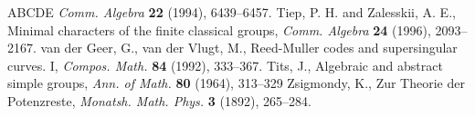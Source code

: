 \documentclass[11pt]{amsart}
\theoremstyle{plain}
\theoremstyle{definition}
\numberwithin{thm}{section}
\numberwithin{equation}{thm}
\newcommand{\0}{\emptyset}
\begin{document}
\begin{thebibliography}{ABCDE}
{\it Comm. Algebra} {\bf 22} (1994), 6439--6457. 
\medskip
{}
Tiep, P. H. and Zalesskii, A. E., Minimal characters of the finite classical
groups, {\it Comm. Algebra} {\bf 24} (1996), 2093--2167.
\medskip
{}van der Geer, G., van der Vlugt, M., Reed-Muller codes and supersingular curves. I, {\it  Compos. Math.} 
{\bf 84} (1992), 333--367.
\medskip
{}
  Tits, J., Algebraic and abstract simple groups, {\it Ann. of Math.} {\bf 80} (1964), 313--329
\medskip
{}
Zsigmondy, K., Zur Theorie der Potenzreste, {\it Monatsh. Math. Phys.} {\bf 3} 
(1892), 265--284.


 
\end{thebibliography}
\end{document}
